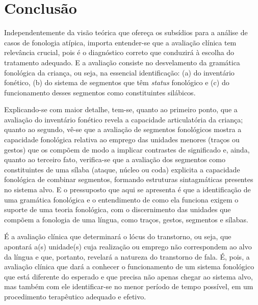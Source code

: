 \documentclass[output=paper,colorlinks,citecolor=brown,booklanguage=portuguese]{langscibook}
\begin{document}
\section{Conclusão}



Independentemente da visão teórica que ofereça os subsídios para a análise de casos de fonologia atípica, importa entender-se que a avaliação clínica tem relevância crucial, pois é o diagnóstico correto que conduzirá à escolha do tratamento adequado. E a avaliação consiste no desvelamento da gramática fonológica da criança, ou seja, na essencial identificação: (a) do inventário fonético, (b) do sistema de segmentos que têm \emph{status} fonológico e (c) do funcionamento desses segmentos como constituintes silábicos.

Explicando-se com maior detalhe, tem-se, quanto ao primeiro ponto, que a avaliação do inventário fonético revela a capacidade articulatória da criança; quanto ao segundo, vê-se que a avaliação de segmentos fonológicos mostra a capacidade fonológica relativa ao emprego das unidades menores (traços ou gestos) que os compõem de modo a implicar contrastes de significado e, ainda, quanto ao terceiro fato, verifica-se que a avaliação dos segmentos como constituintes de uma sílaba (ataque, núcleo ou coda) explicita a capacidade fonológica de combinar segmentos, formando estruturas sintagmáticas presentes no sistema alvo. E o pressuposto que aqui se apresenta é que a identificação de uma gramática fonológica e o entendimento de como ela funciona exigem o suporte de uma teoria fonológica, com o discernimento das unidades que compõem a fonologia de uma língua, como traços, gestos, segmentos e sílabas.

É a avaliação clínica que determinará o lócus do transtorno, ou seja, que apontará a(s) unidade(s) cuja realização ou emprego não correspondem ao alvo da língua e que, portanto, revelará a natureza do transtorno de fala. É, pois, a avaliação clínica que dará a conhecer o funcionamento de um sistema fonológico que está diferente do esperado e que precisa não apenas chegar ao sistema alvo, mas também com ele identificar-se no menor período de tempo possível, em um procedimento terapêutico adequado e efetivo.
\end{document}
